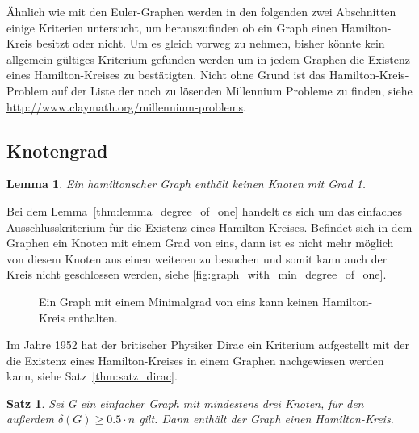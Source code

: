 \documentclass{article}
\newtheorem{mylem}{Lemma}
\newtheorem{mysat}{Satz}
\begin{document}
Ähnlich wie mit den Euler-Graphen werden in den folgenden zwei Abschnitten einige Kriterien untersucht, um herauszufinden ob ein Graph einen Hamilton-Kreis besitzt oder nicht. Um es gleich vorweg zu nehmen, bisher könnte kein allgemein gültiges Kriterium gefunden werden um in jedem Graphen die Existenz eines Hamilton-Kreises zu bestätigten. Nicht ohne Grund ist das Hamilton-Kreis-Problem auf der Liste der noch zu lösenden Millennium Probleme zu finden, siehe \url{http://www.claymath.org/millennium-problems}.


%
%
\subsection{Knotengrad}

\begin{mylem}\label{thm:lemma_degree_of_one}
	Ein hamiltonscher Graph enthält keinen Knoten mit Grad 1.
\end{mylem}

Bei dem Lemma~\autoref{thm:lemma_degree_of_one} handelt es sich um das einfaches Ausschlusskriterium für die Existenz eines Hamilton-Kreises. Befindet sich in dem Graphen ein Knoten mit einem Grad von eins, dann ist es nicht mehr möglich von diesem Knoten aus einen weiteren zu besuchen und somit kann auch der Kreis nicht geschlossen werden, siehe \autoref{fig:graph_with_min_degree_of_one}.

\begin{figure}
	\centering
	\caption{Ein Graph mit einem Minimalgrad von eins kann keinen Hamilton-Kreis enthalten.}
	\label{fig:graph_with_min_degree_of_one}
\end{figure}

Im Jahre 1952 hat der britischer Physiker Dirac ein Kriterium aufgestellt mit der die Existenz eines Hamilton-Kreises in einem Graphen nachgewiesen werden kann, siehe Satz~\autoref{thm:satz_dirac}.

\begin{mysat}\label{thm:satz_dirac}
	Sei G ein einfacher Graph mit mindestens drei Knoten, für den außerdem $\delta(G)\geq 0.5\cdot n$ gilt. Dann enthält der Graph einen Hamilton-Kreis.
\end{mysat}
\end{document}
